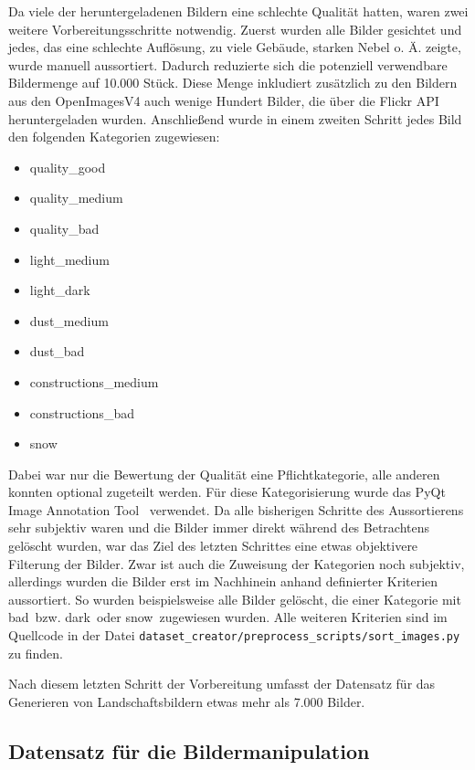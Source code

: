 Da viele der heruntergeladenen Bildern eine schlechte Qualität hatten, waren zwei weitere Vorbereitungsschritte notwendig. Zuerst wurden alle Bilder gesichtet und jedes, das eine schlechte Auflösung, zu viele Gebäude, starken Nebel o. Ä. zeigte, wurde manuell aussortiert. Dadurch reduzierte sich die potenziell verwendbare Bildermenge auf 10.000 Stück. Diese Menge inkludiert zusätzlich zu den Bildern aus den OpenImagesV4 auch wenige Hundert Bilder, die über die Flickr API heruntergeladen wurden. Anschließend wurde in einem zweiten Schritt jedes Bild den folgenden Kategorien zugewiesen:

\begin{itemize}
	\item quality\_good
	\item quality\_medium
	\item quality\_bad
	\item light\_medium
	\item light\_dark
	\item dust\_medium
	\item dust\_bad
	\item constructions\_medium
	\item constructions\_bad
	\item snow
\end{itemize}

Dabei war nur die Bewertung der Qualität eine Pflichtkategorie, alle anderen konnten optional zugeteilt werden. Für diese Kategorisierung wurde das \glqq PyQt Image Annotation Tool\grqq~\cite{brada2022} verwendet. Da alle bisherigen Schritte des Aussortierens sehr subjektiv waren und die Bilder immer direkt während des Betrachtens gelöscht wurden, war das Ziel des letzten Schrittes eine etwas objektivere Filterung der Bilder. Zwar ist auch die Zuweisung der Kategorien noch subjektiv, allerdings wurden die Bilder erst im Nachhinein anhand definierter Kriterien aussortiert. So wurden beispielsweise alle Bilder gelöscht, die einer Kategorie mit \glqq bad\grqq\ bzw. \glqq dark\grqq\ oder \glqq snow\grqq\ zugewiesen wurden. Alle weiteren Kriterien sind im Quellcode in der Datei \texttt{dataset\_creator/preprocess\_scripts/sort\_images.py} zu finden.

Nach diesem letzten Schritt der Vorbereitung umfasst der Datensatz für das Generieren von Landschaftsbildern etwas mehr als 7.000 Bilder.

\subsection{Datensatz für die Bildermanipulation}

